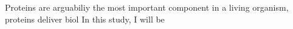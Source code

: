 Proteins are arguabiliy the most important component in a living organism, proteins deliver biol   In this study, I will be 